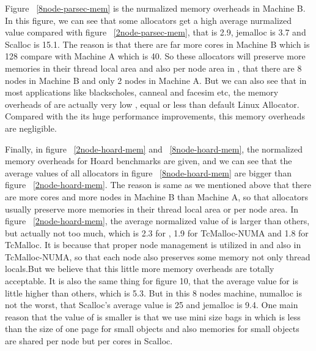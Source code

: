 Figure ~\ref{8node-parsec-mem} is the nurmalized memory overheads in Machine B. In this figure, we can see that some allocators get a high average nurmalized value compared with figure ~\ref{2node-parsec-mem}, that \NM{} is 2.9, jemalloc is 3.7 and Scalloc is 15.1. The reason is that there are far more cores in Machine B which is 128 compare with Machine A which is 40. So these allocators will preserve more memories in their thread local area and also per node area in \NM{}, that there are 8 nodes in Machine B and only 2 nodes in Machine A. But we can also see that in most applications like blackscholes, canneal and facesim etc, the memory overheads of \NM{} are actually very low , equal or less than default Linux Allocator. Compared with the its huge performance improvements, this memory overheads are negligible.

Finally, in figure ~\ref{2node-hoard-mem} and ~\ref{8node-hoard-mem}, the normalized memory overheads for Hoard benchmarks are given, and we can see that the average values of all allocators in figure ~\ref{8node-hoard-mem} are bigger than figure ~\ref{2node-hoard-mem}. The reason is same as we mentioned above that there are more cores and more nodes in Machine B than Machine A, so that allocators usually preserve more memories in their thread local area or per node area. In figure ~\ref{2node-hoard-mem}, the average normalized value of \NM{} is larger than others, but actually not too much, which is 2.3 for \NM{}, 1.9 for TcMalloc-NUMA and 1.8 for TcMalloc. It is because that proper node management is utilized in \NM{} and also in TcMalloc-NUMA, so that each node also preserves some memory not only thread locals.But we believe that this little more memory overheads are totally acceptable. It is also the same thing for figure 10, that the average value for \NM{} is little higher than others, which is 5.3. But in this 8 nodes machine, numalloc is not the worst, that Scalloc's average value is 25 and jemalloc is 9.4. One main reason that the value of \NM{} is smaller is that we use mini size bags in \NM{} which is less than the size of one page for small objects and also memories for small objects are shared per node but per cores in Scalloc.


